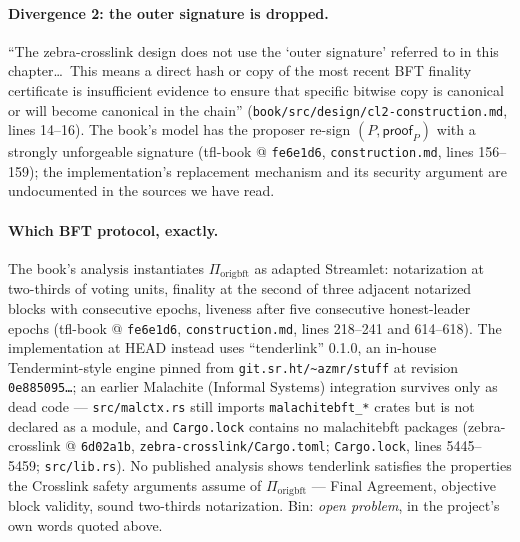 \documentclass[11pt,a4paper]{article}
\theoremstyle{definition}
\begin{document}
\paragraph{Divergence 2: the outer signature is dropped.} ``The
zebra-crosslink design does not use the `outer signature' referred to in
this chapter\ldots\ This means a direct hash or copy of the most recent
BFT finality certificate is insufficient evidence to ensure that specific
bitwise copy is canonical or will become canonical in the chain''
(\texttt{book/src/design/cl2-construction.md}, lines 14--16). The book's
model has the proposer re-sign $(P, \mathsf{proof}_P)$ with a strongly
unforgeable signature (tfl-book @ \texttt{fe6e1d6},
\texttt{construction.md}, lines 156--159); the implementation's
replacement mechanism and its security argument are undocumented in the
sources we have read.

\paragraph{Which BFT protocol, exactly.} The book's analysis instantiates
$\Pi_{\mathrm{origbft}}$ as adapted Streamlet: notarization at two-thirds
of voting units, finality at the second of three adjacent notarized blocks
with consecutive epochs, liveness after five consecutive honest-leader
epochs (tfl-book @ \texttt{fe6e1d6}, \texttt{construction.md}, lines
218--241 and 614--618). The implementation at HEAD instead uses
``tenderlink'' 0.1.0, an in-house Tendermint-style engine pinned from
\texttt{git.sr.ht/\textasciitilde azmr/stuff} at revision
\texttt{0e885095\ldots}; an earlier Malachite (Informal Systems)
integration survives only as dead code --- \texttt{src/malctx.rs} still
imports \texttt{malachitebft\_*} crates but is not declared as a module,
and \texttt{Cargo.lock} contains no malachitebft packages
(zebra-crosslink @ \texttt{6d02a1b}, \texttt{zebra-crosslink/Cargo.toml};
\texttt{Cargo.lock}, lines 5445--5459; \texttt{src/lib.rs}). No published
analysis shows tenderlink satisfies the properties the Crosslink safety
arguments assume of $\Pi_{\mathrm{origbft}}$ --- Final Agreement,
objective block validity, sound two-thirds notarization. Bin: \emph{open
problem}, in the project's own words quoted above.
\end{document}
